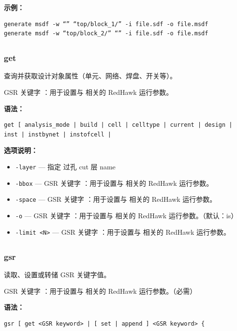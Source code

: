 \textbf{示例：}
\begin{lstlisting}
generate msdf -w “” “top/block_1/” -i file.sdf -o file.msdf
generate msdf -w “top/block_2/” “” -i file.sdf -o file.msdf
\end{lstlisting}

\subsection{}
\subsubsection*{get}

查询并获取设计对象属性（单元、网络、焊盘、开关等）。

GSR 关键字 ：用于设置与  相关的 RedHawk 运行参数。

\textbf{语法：}
\begin{lstlisting}
get [ analysis_mode | build | cell | celltype | current | design | inst | instbynet | instofcell |
\end{lstlisting}

\textbf{选项说明：}
\begin{itemize}
\item \texttt{-layer} — 指定 过孔 cut 层 name
\item \texttt{-bbox} — GSR 关键字 ：用于设置与  相关的 RedHawk 运行参数。
\item \texttt{-space} — GSR 关键字 ：用于设置与  相关的 RedHawk 运行参数。
\item \texttt{-o} — GSR 关键字 ：用于设置与  相关的 RedHawk 运行参数。（默认：is）
\item \texttt{-limit <N>} — GSR 关键字 ：用于设置与  相关的 RedHawk 运行参数。
\end{itemize}

\subsection{}
\subsubsection*{gsr}

读取、设置或转储 GSR 关键字值。

GSR 关键字 ：用于设置与  相关的 RedHawk 运行参数。（必需）

\textbf{语法：}
\begin{lstlisting}
gsr [ get <GSR keyword> | [ set | append ] <GSR keyword> {
\end{lstlisting}

